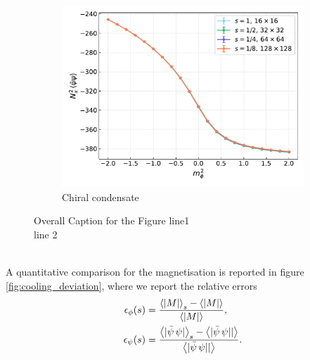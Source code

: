\begin{figure}[hbp]
\begin{subfigure}[b]{0.45\textwidth}
        \includegraphics[width=\textwidth]{figures/cooling/mass_scan/condensate.pdf}
        \caption{Chiral condensate}
    \end{subfigure}
    \caption{Overall Caption for the Figure line1 \\ line 2}
    \label{fig:cooling_M_psibarpsi_chi2}
\end{figure}\\
A quantitative comparison for the magnetisation is reported in figure \ref{fig:cooling_deviation}, where we report the relative errors
\begin{equation}
    \begin{aligned}
        \epsilon_\phi(s) &= \frac{\left\langle |M| \right\rangle_{s} - \left\langle |M| \right\rangle}{\left\langle |M| \right\rangle}, \\
        \epsilon_\psi(s) &= \frac{\left\langle |\bar\psi \, \psi| \right\rangle_{s} - \left\langle |\bar\psi \, \psi|| \right\rangle}{\left\langle |\bar\psi \, \psi|| \right\rangle}.
    \end{aligned}
    \label{eq:cooling_relative_deviation}
\end{equation}
